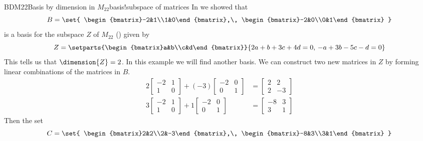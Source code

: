 \begin{example}{BDM22}{Basis by dimension in $M_{22}$}{basis!subspace of matrices}
In  we showed that 
%
\begin{equation*}
B=
\set{
\begin{bmatrix}-2&1\\1&0\end{bmatrix},\,
\begin{bmatrix}-2&0\\0&1\end{bmatrix}
}
\end{equation*}
%
is a basis for the subspace $Z$ of $M_{22}$ () given by
%
\begin{equation*}
Z=\setparts{\begin{bmatrix}a&b\\c&d\end{bmatrix}}{2a+b+3c+4d=0,\,-a+3b-5c-d=0}
\end{equation*}
%
This tells us that $\dimension{Z}=2$.  In this example we will find another basis.  We can construct two new matrices in $Z$ by forming linear combinations of the matrices in $B$.
%
\begin{align*}
    2\begin{bmatrix}-2&1\\1&0\end{bmatrix}+
 (-3)\begin{bmatrix}-2&0\\0&1\end{bmatrix}&=
 \begin{bmatrix}2&2\\2&-3\end{bmatrix}\\
3\begin{bmatrix}-2&1\\1&0\end{bmatrix}+
 1\begin{bmatrix}-2&0\\0&1\end{bmatrix}&=
\begin{bmatrix}-8&3\\3&1\end{bmatrix}
\end{align*}
%
Then the set
%
\begin{equation*}
C=
\set{
\begin{bmatrix}2&2\\2&-3\end{bmatrix},\,
\begin{bmatrix}-8&3\\3&1\end{bmatrix}
}
\end{equation*}
\end{example}
